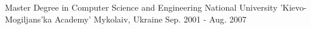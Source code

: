 

\begin{cventries}

  \cventry
    {Master Degree in Computer Science and Engineering} %
    {National University 'Kievo-Mogiljans'ka Academy'} %
    {Mykolaiv, Ukraine} %
    {Sep. 2001 - Aug. 2007} %
    {}

\end{cventries}

